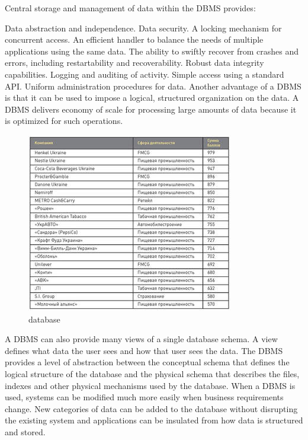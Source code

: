 \documentclass{article}
\begin{document}
Central storage and management of data within the DBMS provides:

Data abstraction and independence.
Data security.
A locking mechanism for concurrent access.
An efficient handler to balance the needs of multiple applications using the same data.
The ability to swiftly recover from crashes and errors, including restartability and recoverability.
Robust data integrity capabilities.
Logging and auditing of activity.
Simple access using a standard API.
Uniform administration procedures for data.
Another advantage of a DBMS is that it can be used to impose a logical, structured organization on the data. A DBMS delivers economy of scale for processing large amounts of data because it is optimized for such operations.
\begin{figure}[h]
\centering
\includegraphics[width=\linewidth5]{3.jpg}

\caption{database}
\end{figure}

A DBMS can also provide many views of a single database schema. A view defines what data the user sees and how that user sees the data. The DBMS provides a level of abstraction between the conceptual schema that defines the logical structure of the database and the physical schema that describes the files, indexes and other physical mechanisms used by the database. When a DBMS is used, systems can be modified much more easily when business requirements change. New categories of data can be added to the database without disrupting the existing system and applications can be insulated from how data is structured and stored.
\end{document}
